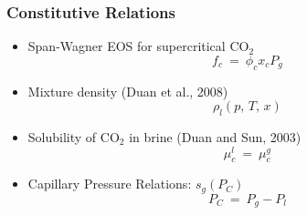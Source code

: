 \documentclass{beamer}
\newcommand{\eq}{\ =\ }
\begin{document}

\begin{frame}
\frametitle{\bf Constitutive Relations}

\begin{itemize}
\item Span-Wagner EOS for supercritical CO$_2$
\[ f_c^{} \eq \phi_c^{} x_c^{} P_g^{} \]

\item Mixture density (Duan et al., 2008)
\[ \rho_l^{}(p,\,T,\,x) \]

\item Solubility of CO$_2$ in brine (Duan and Sun, 2003)
\[ \mu_c^l \eq \mu_c^g \]

\item Capillary Pressure Relations: $s_g(P_C)$
\[ P_C^{} \eq P_g^{} - P_l^{} \]

\end{itemize}
\end{frame}

\end{document}
